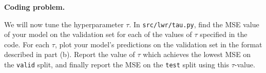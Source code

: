 \item {} \textbf{Coding problem.}

We will now tune the hyperparameter $\tau$.
In \texttt{src/lwr/tau.py}, find the MSE value of your model on the
validation set for each of the values of $\tau$ specified in the code. For each
$\tau$, plot your model's predictions on the validation set in the format
described in part (b). Report the value of $\tau$ which achieves the lowest MSE
on the \texttt{valid} split, and finally report the MSE on the \texttt{test}
split using this $\tau$-value.

